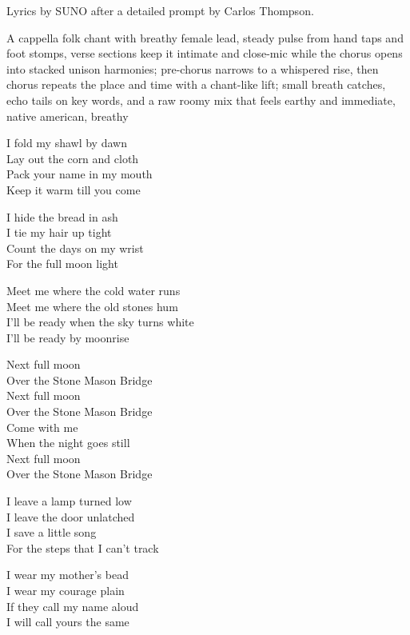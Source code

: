 
\begin{notes}
Lyrics by SUNO after a detailed prompt by Carlos Thompson.
\end{notes}
\begin{style}
A cappella folk chant with breathy female lead, steady pulse from hand taps and foot stomps, verse sections keep it intimate and close-mic while the chorus opens into stacked unison harmonies; pre-chorus narrows to a whispered rise, then chorus repeats the place and time with a chant-like lift; small breath catches, echo tails on key words, and a raw roomy mix that feels earthy and immediate, native american, breathy
\end{style}
\begin{lyrics}
I fold my shawl by dawn\\
Lay out the corn and cloth\\
Pack your name in my mouth\\
Keep it warm till you come

I hide the bread in ash\\
I tie my hair up tight\\
Count the days on my wrist\\
For the full moon light

Meet me where the cold water runs\\
Meet me where the old stones hum\\
I’ll be ready when the sky turns white\\
I’ll be ready by moonrise

Next full moon\\
Over the Stone Mason Bridge\\
Next full moon\\
Over the Stone Mason Bridge\\
Come with me\\
When the night goes still\\
Next full moon\\
Over the Stone Mason Bridge

I leave a lamp turned low\\
I leave the door unlatched\\
I save a little song\\
For the steps that I can’t track

I wear my mother’s bead\\
I wear my courage plain\\
If they call my name aloud\\
I will call yours the same


\end{lyrics}
